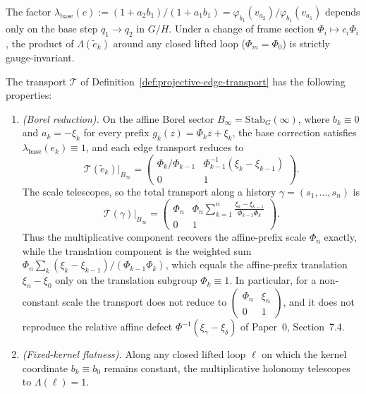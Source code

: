 The factor $\lambda_{\mathrm{base}}(e) := (1+a_2 b_1)/(1+a_1 b_1) =
\varphi_{b_1}(v_{a_2})/\varphi_{b_1}(v_{a_1})$ depends only on the base step
$q_1\to q_2$ in $G/H$. Under a change of frame section $\Phi_i \mapsto c_i \Phi_i$,
the product of $\Lambda(\tilde{e}_k)$ around any closed lifted loop
($\Phi_m=\Phi_0$) is strictly gauge-invariant.

\begin{theorem}
\label{thm:projective-torsion-solution}
The transport $\mathcal{T}$ of Definition~\ref{def:projective-edge-transport}
has the following properties:
\begin{enumerate}
  \item \emph{(Borel reduction).} On the affine Borel sector
  $B_\infty = \mathrm{Stab}_G(\infty)$, where $b_k\equiv 0$ and $a_k=-\xi_k$ for
  every prefix $g_k(z)=\Phi_k z + \xi_k$, the base correction satisfies
  $\lambda_{\mathrm{base}}(e_k)\equiv 1$, and each edge transport reduces to
  \[
    \mathcal{T}(\tilde e_k)\big|_{B_\infty}
    = \begin{pmatrix} \Phi_k/\Phi_{k-1} & \Phi_{k-1}^{-1}(\xi_k-\xi_{k-1}) \\ 0 & 1 \end{pmatrix}.
  \]
  The scale telescopes, so the total transport along a history
  $\gamma=(s_1,\dots,s_n)$ is
  \begin{equation}\label{eq:borel-reduction-total}
    \mathcal{T}(\gamma)\big|_{B_\infty}
    = \begin{pmatrix}
        \Phi_n & \Phi_n\displaystyle\sum_{k=1}^n\frac{\xi_k-\xi_{k-1}}{\Phi_{k-1}\Phi_k}\\[10pt]
        0 & 1
      \end{pmatrix}.
  \end{equation}
  Thus the multiplicative component recovers the affine-prefix scale $\Phi_n$
  exactly, while the translation component is the weighted sum
  $\Phi_n\sum_k(\xi_k-\xi_{k-1})/(\Phi_{k-1}\Phi_k)$, which equals the
  affine-prefix translation $\xi_n-\xi_0$ only on the translation subgroup
  $\Phi_k\equiv1$.  In particular, for a non-constant scale the transport does
  not reduce to $\begin{pmatrix}\Phi_n&\xi_n\\0&1\end{pmatrix}$, and it does not
  reproduce the relative affine defect $\Phi^{-1}(\xi_\gamma-\xi_\delta)$ of
  Paper~0, Section~7.4.

  \item \emph{(Fixed-kernel flatness).} Along any closed lifted loop $\ell$ on which
  the kernel coordinate $b_k\equiv b_0$ remains constant, the multiplicative
  holonomy telescopes to $\Lambda(\ell)=1$.


\end{enumerate}
\end{theorem}
